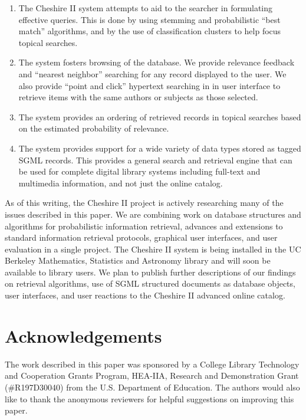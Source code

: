 \begin{enumerate}

\item The Cheshire II system attempts to aid to the searcher in 
formulating effective
queries. This is done by using stemming and probabilistic ``best match''
algorithms, and by the use of classification clusters to help focus
topical searches.

\item The system fosters browsing of the database. We provide relevance
feedback and ``nearest neighbor'' searching for any record displayed to
the user. We also provide ``point and click'' hypertext searching in
in user interface to retrieve items with the same authors or subjects as
those selected.

\item The system provides an ordering of retrieved records in topical
searches based on the estimated probability of relevance.

\item The system provides support for a wide variety of data types
stored as tagged SGML records. This provides a general search and
retrieval engine that can be used for complete digital library 
systems\cite{DIGLIB} including
full-text and multimedia information, and not just the online catalog.

\end{enumerate}

As of this writing, the Cheshire II project is actively researching
many of the issues described in this paper. We are combining work on
database structures and algorithms for probabilistic information
retrieval, advances and extensions to standard information retrieval
protocols, graphical user interfaces, and user evaluation in a single
project.  The Cheshire II system is being installed in the UC Berkeley
Mathematics, Statistics and Astronomy library and will soon be available to
library users. We plan to publish further descriptions of our findings
on retrieval algorithms, use of SGML structured documents as database
objects, user interfaces, and user reactions to the Cheshire II
advanced online catalog.

\section{Acknowledgements}

The work described in this paper was sponsored by a College Library
Technology and Cooperation Grants Program, HEA-IIA, Research and
Demonstration Grant (\#R197D30040) from the U.S. Department of
Education.  The authors would also like to thank the anonymous
reviewers for helpful suggestions on improving this paper.


